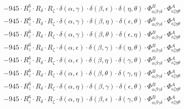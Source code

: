 \documentclass{article}
\begin{document}
\begin{equation}
\begin{array}{c}
 \\[0.2em] 		 - 945 \cdot R_{z}^{6} \cdot R_{\delta{}} \cdot R_{\zeta{}} \cdot \delta{}\left(\alpha{}, \gamma{}\right) \cdot \delta{}\left(\beta{}, \epsilon{}\right) \cdot \delta{}\left(\eta{}, \theta{}\right) \cdot \Phi{}^{B}_{\alpha{}\beta{}\gamma{}\delta{}} \cdot \Phi{}^{A}_{\epsilon{}\zeta{}\eta{}\theta{}} 
 \\[0.2em] 		 - 945 \cdot R_{z}^{6} \cdot R_{\delta{}} \cdot R_{\zeta{}} \cdot \delta{}\left(\alpha{}, \gamma{}\right) \cdot \delta{}\left(\beta{}, \eta{}\right) \cdot \delta{}\left(\epsilon{}, \theta{}\right) \cdot \Phi{}^{B}_{\alpha{}\beta{}\gamma{}\delta{}} \cdot \Phi{}^{A}_{\epsilon{}\zeta{}\eta{}\theta{}} 
 \\[0.2em] 		 - 945 \cdot R_{z}^{6} \cdot R_{\delta{}} \cdot R_{\zeta{}} \cdot \delta{}\left(\alpha{}, \gamma{}\right) \cdot \delta{}\left(\beta{}, \theta{}\right) \cdot \delta{}\left(\epsilon{}, \eta{}\right) \cdot \Phi{}^{B}_{\alpha{}\beta{}\gamma{}\delta{}} \cdot \Phi{}^{A}_{\epsilon{}\zeta{}\eta{}\theta{}} 
 \\[0.2em] 		 - 945 \cdot R_{z}^{6} \cdot R_{\delta{}} \cdot R_{\zeta{}} \cdot \delta{}\left(\alpha{}, \epsilon{}\right) \cdot \delta{}\left(\beta{}, \gamma{}\right) \cdot \delta{}\left(\eta{}, \theta{}\right) \cdot \Phi{}^{B}_{\alpha{}\beta{}\gamma{}\delta{}} \cdot \Phi{}^{A}_{\epsilon{}\zeta{}\eta{}\theta{}} 
 \\[0.2em] 		 - 945 \cdot R_{z}^{6} \cdot R_{\delta{}} \cdot R_{\zeta{}} \cdot \delta{}\left(\alpha{}, \epsilon{}\right) \cdot \delta{}\left(\beta{}, \eta{}\right) \cdot \delta{}\left(\gamma{}, \theta{}\right) \cdot \Phi{}^{B}_{\alpha{}\beta{}\gamma{}\delta{}} \cdot \Phi{}^{A}_{\epsilon{}\zeta{}\eta{}\theta{}} 
 \\[0.2em] 		 - 945 \cdot R_{z}^{6} \cdot R_{\delta{}} \cdot R_{\zeta{}} \cdot \delta{}\left(\alpha{}, \epsilon{}\right) \cdot \delta{}\left(\beta{}, \theta{}\right) \cdot \delta{}\left(\gamma{}, \eta{}\right) \cdot \Phi{}^{B}_{\alpha{}\beta{}\gamma{}\delta{}} \cdot \Phi{}^{A}_{\epsilon{}\zeta{}\eta{}\theta{}} 
 \\[0.2em] 		 - 945 \cdot R_{z}^{6} \cdot R_{\delta{}} \cdot R_{\zeta{}} \cdot \delta{}\left(\alpha{}, \eta{}\right) \cdot \delta{}\left(\beta{}, \gamma{}\right) \cdot \delta{}\left(\epsilon{}, \theta{}\right) \cdot \Phi{}^{B}_{\alpha{}\beta{}\gamma{}\delta{}} \cdot \Phi{}^{A}_{\epsilon{}\zeta{}\eta{}\theta{}} 
 \\[0.2em] 		 - 945 \cdot R_{z}^{6} \cdot R_{\delta{}} \cdot R_{\zeta{}} \cdot \delta{}\left(\alpha{}, \eta{}\right) \cdot \delta{}\left(\beta{}, \epsilon{}\right) \cdot \delta{}\left(\gamma{}, \theta{}\right) \cdot \Phi{}^{B}_{\alpha{}\beta{}\gamma{}\delta{}} \cdot \Phi{}^{A}_{\epsilon{}\zeta{}\eta{}\theta{}} 

\end{array}
\end{equation}
\end{document}
